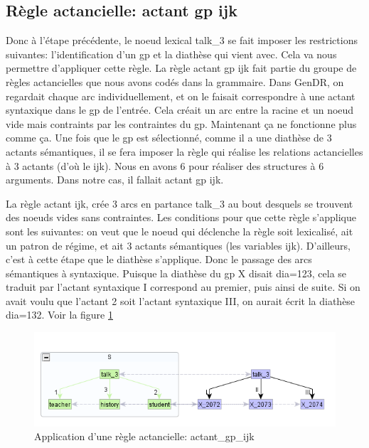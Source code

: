 \subsection{Règle actancielle: actant gp ijk}
Donc à l'étape précédente, le noeud lexical talk\_3 se fait imposer les restrictions suivantes: l'identification d'un gp et la diathèse qui vient avec. Cela va nous permettre d'appliquer cette règle. La règle actant gp ijk fait partie du groupe de règles actancielles que nous avons codés dans la grammaire. Dans GenDR, on regardait chaque arc individuellement, et on le faisait correspondre à une actant syntaxique dans le gp de l'entrée. Cela créait un arc entre la racine et un noeud vide mais contraints par les contraintes du gp. Maintenant ça ne fonctionne plus comme ça. Une fois que le gp est sélectionné, comme il a une diathèse de 3 actants sémantiques, il se fera imposer la règle qui réalise les relations actancielles à 3 actants (d'où le ijk). Nous en avons 6 pour réaliser des structures à 6 arguments. Dans notre cas, il fallait actant gp ijk.

La règle actant ijk, crée 3 arcs en partance talk\_3 au bout desquels se trouvent des noeuds vides sans contraintes. Les conditions pour que cette règle s'applique sont les suivantes: on veut que le noeud qui déclenche la règle soit lexicalisé, ait un patron de régime, et ait 3 actants sémantiques (les variables ijk). D'ailleurs, c'est à cette étape que le diathèse s'applique. Donc le passage des arcs sémantiques à syntaxique. Puisque la diathèse du gp X disait dia=123, cela se traduit par l'actant syntaxique I correspond au premier, puis ainsi de suite. Si on avait voulu que l'actant 2 soit l'actant syntaxique III, on aurait écrit la diathèse dia=132. Voir la figure \ref{deroulement2} 

\begin{figure}[htb]
	\centering
	\includegraphics[width=1\textwidth, trim = {0cm 0cm 0cm 0cm},clip]{ch6/figs/actant_gp_ijk.png}
	\caption{Application d'une règle actancielle: actant\_gp\_ijk}
	\label{deroulement2}
\end{figure}

